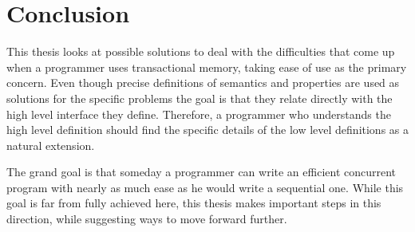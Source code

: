 \documentclass[runningheads,a4paper]{article}
\begin{document}





\section{Conclusion}
This thesis looks at possible solutions to deal with the difficulties that come up when
a programmer uses transactional memory, taking ease of use as the primary concern.
Even though precise definitions of semantics and properties are used as solutions
for the specific problems the goal is that they relate directly with the high level interface they define.
Therefore, a programmer who
understands the high level definition should find the specific details of the low level definitions as a
natural extension.

The grand goal is that someday a programmer can write an efficient concurrent program
with nearly as much ease as he would write a sequential one.
While this goal is far from fully achieved here,
this thesis makes important steps in this direction, while suggesting ways to move forward further.
\end{document}
